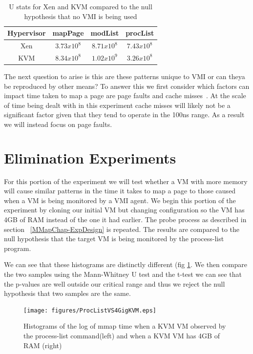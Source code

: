 	\begin{table}[p!]
		\centering
		\begin{tabular}{| c | c | c | c |}
			\hline
			Hypervisor & mapPage & modList & procList  \\ \hline
			Xen & $3.73x10^{8}$ & $8.71x10^{8}$ & $7.43x10^{8}$  \\  \hline
			KVM & $8.34x10^{8}$ & $1.02x10^{9}$ & $3.26x10^{8}$ \\  \hline
		\end{tabular}
		\label{MannWhitneyMMap1}
		\caption{U stats for Xen and KVM compared to the null hypothesis that no VMI is being used}
	\end{table}



The next question to arise is this are these patterns unique to VMI or can theya be reproduced by other means? To answer this we first consider which factors can impact time taken to map a page are page faults and cache misses~\cite{bryant_computer_2003}.  At the scale of time being dealt with in this experiment cache misses will likely not be a significant factor given that they tend to operate in the 100ns range. As a result we will instead focus on page faults. 

\section{Elimination Experiments}

For this portion of the experiment we will test whether a VM with more memory will cause similar patterns in the time it takes to map a page  to those caused when a VM is being monitored by a VMI agent. We begin this portion of the experiment by cloning our initial VM but changing configuration so the VM has 4GB of RAM instead of the one it had earlier. The probe process as described in section ~\ref{MMapChap-ExpDesign} is repeated. The results are compared to the null hypothesis that the target VM is being monitored by the process-list program. 


We can see that these histograms are distinctly different (fig \ref{KVMMMapVS4Gig}. We then compare the two samples using the Mann-Whitney U test and the t-test we can see that the p-values are well outside our critical range and thus we reject the null hypothesis that two samples are the same. 

	\begin{figure}[p!]\label{KVMMMapVS4Gig}
	  \centering
	  \texttt{[image: figures/ProcListVS4GigKVM.eps]}
	  \caption{Histograms of the log of mmap time when a KVM VM observed by the process-list command(left) and when a KVM VM has 4GB of RAM (right)} 
	\end{figure}

